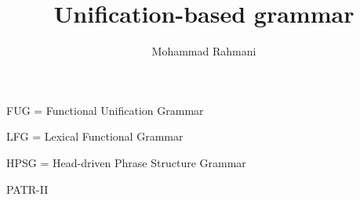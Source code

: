 \documentclass[a4paper]{article}
\title{Unification-based grammar}
\date{}
\author{Mohammad Rahmani}
\begin{document}
    \maketitle
    
    FUG  = Functional Unification Grammar
    
    LFG  = Lexical Functional Grammar
    
    HPSG = Head-driven Phrase Structure Grammar
    
    PATR-II
    
    
\end{document}

